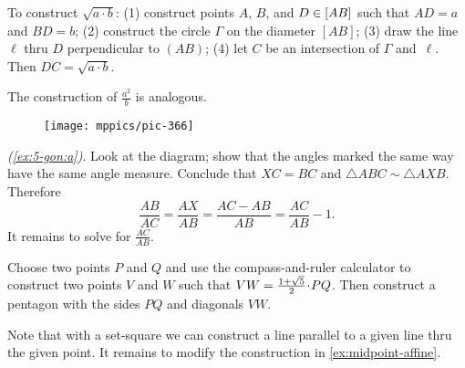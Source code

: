 \begin{multicols}{2}
\setcounter{eqtn}{0}

%
%
%
%

To construct  $\sqrt{a\cdot b}$:
(1) construct points $A$, $B$, and $D\z\in [AB]$
such that $AD=a$ and $BD=b$;
(2) construct the circle $\Gamma$ on the diameter $[AB]$;
(3) draw the line $\ell$ thru $D$ perpendicular to $(AB)$; 
(4) let $C$ be an intersection of $\Gamma$ and~$\ell$.
Then $DC= \sqrt{a\cdot b}$.

The construction of $\tfrac{a^2}b$ is analogous.

{

\begin{wrapfigure}{r}{27mm}
\vskip-4mm
\centering
\texttt{[image: mppics/pic-366]}
\end{wrapfigure}

\parbf{\ref{ex:5-gon},} \textit{(\ref{ex:5-gon:a})}.
Look at the diagram;
show that the angles marked the same way have the same angle measure.
Conclude that $XC=BC$ and $\triangle ABC\sim \triangle AXB$.
Therefore 
\[\frac{AB}{AC}=\frac{AX}{AB}=\frac{AC-AB}{AB}=\frac{AC}{AB}-1.\]
It remains to solve for $\frac{AC}{AB}$.

}

 Choose two points $P$ and $Q$ and use the compass-and-ruler calculator to construct two points $V$ and $W$ such that $VW\z=\tfrac{1+\sqrt5}2\cdot PQ$.
Then construct a pentagon with the sides $PQ$ and diagonals $VW$.

Note that with a set-square we can construct a line parallel to a given line thru the given point.
It remains to modify the construction in \ref{ex:midpoint-affine}.


\end{multicols}
